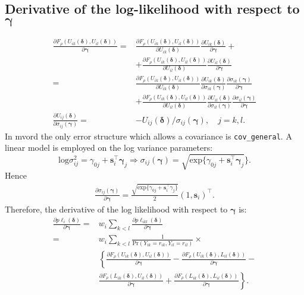 \documentclass[a4paper,fleqn]{article}
\newcommand{\LOG}{\mathrm{log}}
\newcommand{\EXP}{\mathrm{exp}}
\newcommand{\pkg}[1]{{\fontseries{b}\selectfont #1}}
\begin{document}
\subsection{Derivative of the log-likelihood with respect to $\bm\gamma$}
\begin{align*}
\frac{\partial F_\rho(U_{ik}(\bm\delta),U_{il}(\bm\delta))}{\partial\bm\gamma}=& \frac{\partial F_\rho(U_{ik}(\bm\delta),U_{il}(\bm\delta))}{\partial U_{ik}(\bm\delta)}\frac{\partial U_{ik}(\bm\delta)}{\partial\bm\gamma} + \\
  & + \frac{\partial F_\rho(U_{ik}(\bm\delta),U_{il}(\bm\delta))}{\partial U_{il}(\bm\delta)}\frac{\partial U_{il}(\bm\delta)}{\partial\bm\gamma}
\\
=& \frac{\partial F_\rho(U_{ik}(\bm\delta),U_{il}(\bm\delta))}{\partial U_{ik}(\bm\delta)}\frac{\partial U_{ik}(\bm\delta)}{\partial \sigma_{ik}(\bm\gamma)}
\frac{\partial \sigma_{ik}(\bm\gamma)}{\partial\bm\gamma}\\
  & + \frac{\partial F_\rho(U_{ik}(\bm\delta),U_{il}(\bm\delta))}{\partial U_{il}(\bm\delta)}\frac{\partial U_{il}(\bm\delta)}{\partial \sigma_{il}(\bm\gamma)}
\frac{\partial \sigma_{il}(\bm\gamma)}{\partial\bm\gamma}\\
\frac{\partial U_{ij}(\bm\delta)}{\partial \sigma_{ij}(\bm\gamma)}=& - U_{ij}(\bm\delta)/\sigma_{ij}(\bm\gamma), \quad j=k,l.
\end{align*}
In \pkg{mvord} the only error structure which allows a covariance is \texttt{cov\_general}. A linear model is employed on the log variance parameters:
$$\LOG \sigma_{ij}^2=\gamma_{0j} + \bm s^\top_i\bm\gamma_j \Rightarrow \sigma_{ij}(\bm\gamma)=\sqrt{\EXP\{\gamma_{0j} + \bm s^\top_i\bm\gamma_j}\}.$$
Hence
\begin{align*}
\frac{\partial \sigma_{ij}(\bm\gamma)}{\partial\bm\gamma}=\frac{\sqrt{\EXP\{\gamma_{0j} + \bm s^\top_i\gamma_j\}}}{2}(1,\bm s_i)^\top.
\end{align*}
Therefore, the derivative of the log likelihood with respect to $\bm\gamma$ is:
\begin{align*}
\frac{\partial p\ell_i(\bm\delta)}{\partial \bm\gamma}=&w_i\sum_{k<l}\frac{\partial p\ell_{ikl}(\bm\delta)}{\partial \bm\gamma} \\
=&w_i\sum_{k<l}\frac{1}{\mathrm{Pr}(Y_{ik}=r_{ik}, Y_{il}=r_{il})}\times\\
&\left\{\frac{\partial F_\rho(U_{ik}(\bm\delta),U_{il}(\bm\delta))}{\partial\bm\gamma}-
\frac{\partial F_\rho(U_{ik}(\bm\delta),L_{il}(\bm\delta))}{\partial\bm\gamma} - \right.\\
&\left.\frac{\partial F_\rho(L_{ik}(\bm\delta),U_{il}(\bm\delta))}{\partial\bm\gamma} + \frac{\partial F_\rho(L_{ik}(\bm\delta),L_{il}(\bm\delta))}{\partial\bm\gamma}\right\}.
\end{align*}
\end{document}

